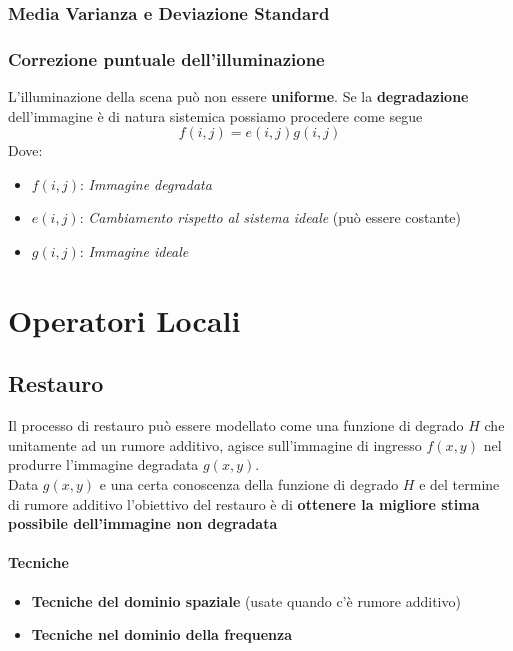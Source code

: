 \documentclass[12pt]{article}
\begin{document}
\subsubsection{Media Varianza e Deviazione Standard}
\subsubsection{Correzione puntuale dell'illuminazione}
L'illuminazione della scena può non essere \textbf{uniforme}. Se la \textbf{degradazione} dell'immagine è di natura sistemica possiamo procedere come segue
$$f(i,j)=e(i,j)g(i,j)$$
Dove:
\begin{itemize}[label=]
    \item $f(i,j)$: \textit{Immagine degradata}
    \item $e(i,j)$: \textit{Cambiamento rispetto al sistema ideale} (può essere costante)
    \item $g(i,j)$: \textit{Immagine ideale}
\end{itemize}
\newpage
\section{Operatori Locali}
\subsection{Restauro}
Il processo di restauro può essere modellato come una funzione di degrado $H$ che unitamente ad un rumore additivo, agisce sull'immagine di ingresso $f(x,y)$ nel produrre l'immagine degradata $g(x,y)$.
\\Data $g(x,y)$ e una certa conoscenza della funzione di degrado $H$ e del termine di rumore additivo l'obiettivo del restauro è di \textbf{ottenere la migliore stima possibile dell'immagine non degradata}
\paragraph{Tecniche}
\begin{itemize}
    \item \textbf{Tecniche del dominio spaziale} (usate quando c'è rumore additivo)
    \item \textbf{Tecniche nel dominio della frequenza}
\end{itemize}
\end{document}
